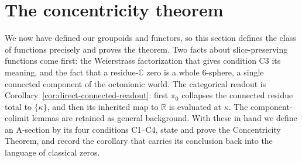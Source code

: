 \documentclass[11pt]{article}
\newcommand{\CC}{\mathbb{C}}
\newcommand{\RR}{\mathbb{R}}
\theoremstyle{plain}
\theoremstyle{definition}
\theoremstyle{remark}
\begin{document}
\section{The concentricity theorem}\label{sec:detector}

We now have defined our groupoids and functors, so this section defines the class of functions
precisely and proves the theorem. Two facts about slice-preserving functions come first: the Weierstrass
factorization that gives condition C3 its meaning, and the fact that a residue-$\CC$ zero is a whole
$6$-sphere, a single connected component of the octonionic world. The
categorical readout is Corollary~\ref{cor:direct-connected-readout}: first
$\pi_0$ collapses the connected residue total to $\{\kappa\}$, and then its
inherited map to $\RR$ is evaluated at $\kappa$. The component-colimit lemmas
are retained as general background. With these in hand
we define an A-section by its four conditions C1--C4, state and prove the Concentricity Theorem, and
record the corollary that carries its conclusion back into the language of classical zeros.
\end{document}
